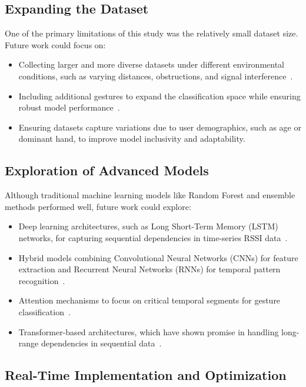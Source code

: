 \documentclass[10pt,twocolumn,letterpaper]{article}
\begin{document}
\subsection{Expanding the Dataset}

One of the primary limitations of this study was the relatively small dataset size. Future work could focus on:
\begin{itemize}
    \item Collecting larger and more diverse datasets under different environmental conditions, such as varying distances, obstructions, and signal interference~\cite{wang2017wifi}.
    \item Including additional gestures to expand the classification space while ensuring robust model performance~\cite{haseeb2020wisture}.
    \item Ensuring datasets capture variations due to user demographics, such as age or dominant hand, to improve model inclusivity and adaptability.
\end{itemize}

\subsection{Exploration of Advanced Models}

Although traditional machine learning models like Random Forest and ensemble methods performed well, future work could explore:
\begin{itemize}
    \item Deep learning architectures, such as Long Short-Term Memory (LSTM) networks, for capturing sequential dependencies in time-series RSSI data~\cite{haseeb2020wisture}.
    \item Hybrid models combining Convolutional Neural Networks (CNNs) for feature extraction and Recurrent Neural Networks (RNNs) for temporal pattern recognition~\cite{wang2017wifi}.
    \item Attention mechanisms to focus on critical temporal segments for gesture classification~\cite{vaswani2017attention}.
    \item Transformer-based architectures, which have shown promise in handling long-range dependencies in sequential data~\cite{vaswani2017attention}.
\end{itemize}

\subsection{Real-Time Implementation and Optimization}
\end{document}
